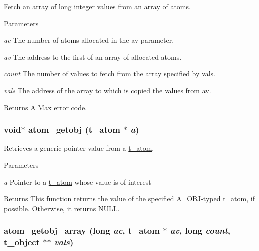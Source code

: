 Fetch an array of long integer values from an array of atoms. 
\begin{DoxyParams}{Parameters}
\item[{\em ac}]The number of atoms allocated in the av parameter. \item[{\em av}]The address to the first of an array of allocated atoms. \item[{\em count}]The number of values to fetch from the array specified by vals. \item[{\em vals}]The address of the array to which is copied the values from av. \end{DoxyParams}
\begin{DoxyReturn}{Returns}
A Max error code. 
\end{DoxyReturn}
\hypertarget{group__atom_ga3fa97bb8b72a394a2918cc55951f8b39}{
\subsubsection[{atom\_\-getobj}]{\setlength{\rightskip}{0pt plus 5cm}void$\ast$ atom\_\-getobj ({\bf t\_\-atom} $\ast$ {\em a})}}
\label{group__atom_ga3fa97bb8b72a394a2918cc55951f8b39}


Retrieves a generic pointer value from a \hyperlink{structt__atom}{t\_\-atom}. 
\begin{DoxyParams}{Parameters}
\item[{\em a}]Pointer to a \hyperlink{structt__atom}{t\_\-atom} whose value is of interest \end{DoxyParams}
\begin{DoxyReturn}{Returns}
This function returns the value of the specified \hyperlink{group__atom_gga8aa6700e9f00b132eb376db6e39ade47a82cc76e0d53c8fc28df167c35d5bbd1a}{A\_\-OBJ}-\/typed \hyperlink{structt__atom}{t\_\-atom}, if possible. Otherwise, it returns NULL. 
\end{DoxyReturn}
\hypertarget{group__atom_gac8571c66b47e3699520695352d2eff30}{
\subsubsection[{atom\_\-getobj\_\-array}]{ atom\_\-getobj\_\-array (long {\em ac}, \/  {\bf t\_\-atom} $\ast$ {\em av}, \/  long {\em count}, \/  {\bf t\_\-object} $\ast$$\ast$ {\em vals})}}
\label{group__atom_gac8571c66b47e3699520695352d2eff30}


